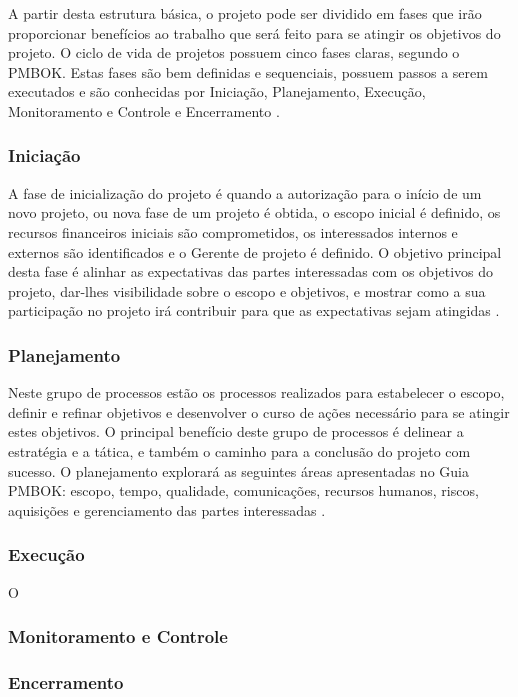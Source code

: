 \documentclass[
    12pt,               %
    openright,          %
    twoside,            %
    a4paper,            %
    chapter=TITLE,     %
    english,            %
    spanish,            %
    portuguese              %
    ]{abntex2}
\begin{document}
A partir desta estrutura básica, o projeto pode ser dividido em fases que irão proporcionar benefícios ao trabalho que será feito para se atingir os objetivos do projeto. O ciclo de vida de projetos possuem cinco fases claras, segundo o PMBOK. Estas fases são bem definidas e sequenciais, possuem passos a serem executados e são conhecidas por Iniciação, Planejamento, Execução, Monitoramento e Controle e Encerramento \cite[p.~14]{Cruz2013}. 

\subsubsection{Iniciação}
A fase de inicialização do projeto é quando a autorização para o início de um novo projeto, ou nova fase de um projeto é obtida, o escopo inicial é definido, os recursos financeiros iniciais são comprometidos, os interessados internos e externos são identificados e o Gerente de projeto é definido. O objetivo principal desta fase é alinhar as expectativas das partes interessadas com os objetivos do projeto, dar-lhes visibilidade sobre o escopo e objetivos, e mostrar como a sua participação no projeto irá contribuir para que as expectativas sejam atingidas \cite[p.~54]{pmi2013}.

\subsubsection{Planejamento}
Neste grupo de processos estão os processos realizados para estabelecer o escopo, definir e refinar objetivos e desenvolver o curso de ações necessário para se atingir estes objetivos. O principal benefício deste grupo de processos é delinear a estratégia e a tática, e também o caminho para a conclusão do projeto com sucesso. O planejamento explorará as seguintes áreas apresentadas no Guia PMBOK: escopo, tempo, qualidade, comunicações, recursos humanos, riscos, aquisições e gerenciamento das partes interessadas \cite[p.~55]{pmi2013}.

\subsubsection{Execução}
O 

\subsubsection{Monitoramento e Controle}


\subsubsection{Encerramento}
\end{document}
